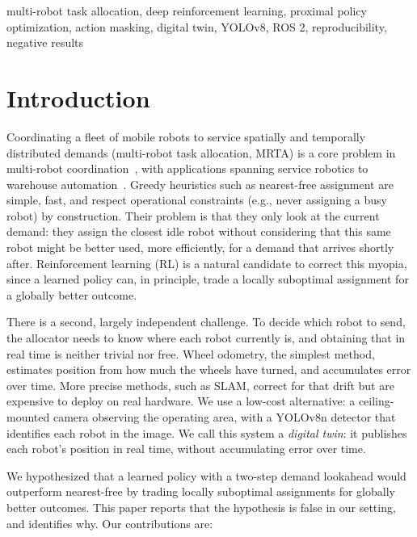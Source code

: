 \documentclass[conference]{IEEEtran}
\begin{document}
\begin{IEEEkeywords}
multi-robot task allocation, deep reinforcement learning, proximal policy optimization, action masking, digital twin, YOLOv8, ROS 2, reproducibility, negative results
\end{IEEEkeywords}

\section{Introduction}

Coordinating a fleet of mobile robots to service spatially and temporally distributed demands (multi-robot task allocation, MRTA) is a core problem in multi-robot coordination~\cite{gerkey2004formal}, with applications spanning service robotics to warehouse automation~\cite{agrawal2022dcmrta,pal2025together}. Greedy heuristics such as nearest-free assignment are simple, fast, and respect operational constraints (e.g., never assigning a busy robot) by construction. Their problem is that they only look at the current demand: they assign the closest idle robot without considering that this same robot might be better used, more efficiently, for a demand that arrives shortly after. Reinforcement learning (RL) is a natural candidate to correct this myopia, since a learned policy can, in principle, trade a locally suboptimal assignment for a globally better outcome.

There is a second, largely independent challenge. To decide which robot to send, the allocator needs to know where each robot currently is, and obtaining that in real time is neither trivial nor free. Wheel odometry, the simplest method, estimates position from how much the wheels have turned, and accumulates error over time. More precise methods, such as SLAM, correct for that drift but are expensive to deploy on real hardware. We use a low-cost alternative: a ceiling-mounted camera observing the operating area, with a YOLOv8n detector that identifies each robot in the image. We call this system a \emph{digital twin}: it publishes each robot's position in real time, without accumulating error over time.

We hypothesized that a learned policy with a two-step demand lookahead would outperform nearest-free by trading locally suboptimal assignments for globally better outcomes. This paper reports that the hypothesis is false in our setting, and identifies why. Our contributions are:
\end{document}
